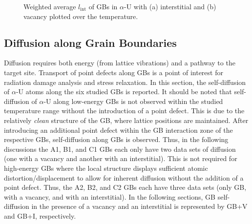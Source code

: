 \documentclass[review]{elsarticle}
\begin{document}
\begin{figure}[h!]
\centering
{}
\caption{Weighted average $l_{\mathrm{int}}$ of GBs in $\alpha$-U with (a) interstitial and (b) vacancy plotted over the temperature.}
\label{fig:IL}
\end{figure}

\FloatBarrier

\subsection{Diffusion along Grain Boundaries}
Diffusion requires both energy (from lattice vibrations) and a pathway to the target site. Transport of point defects along GBs is a point of interest for radiation damage analysis and stress relaxation. In this section, the self-diffusion of $\alpha$-U atoms along the six studied GBs is reported. It should be noted that self-diffusion of $\alpha$-U along low-energy GBs is not observed within the studied temperature range without the introduction of a point defect. This is due to the relatively \textit{clean} structure of the GB, where lattice positions are maintained. After introducing an additional point defect within the GB interaction zone of the respective GBs, self-diffusion along GBs is observed. Thus, in the following discussions the A1, B1, and C1 GBs each only have two data sets of diffusion (one with a vacancy and another with an interstitial). This is not required for high-energy GBs where the local structure displays sufficient atomic distortion/displacement to allow for inherent diffusion without the addition of a point defect. Thus, the A2, B2, and C2 GBs each have three data sets (only GB, with a vacancy, and with an interstitial). In the following sections, GB self-diffusion in the presence of a vacancy and an interstitial is represented by GB+V and GB+I, respectively. 
\end{document}
